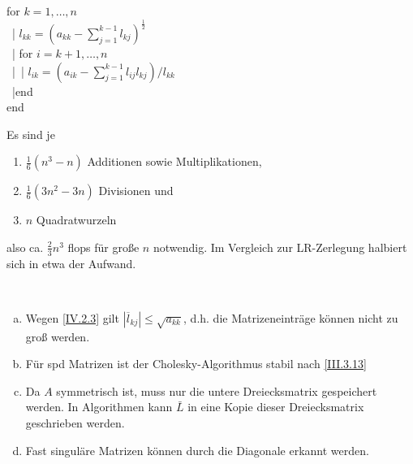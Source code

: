 \begin{pseudocode}{0.55\linewidth}
  for  $k=1, \dotsc , n$\\
  ~|\> $l_{kk} = (a_{kk}-\sum_{j=1}^{k-1}l_{kj})^{\frac{1}{2}}$ \\
  ~|\> for $i= k+1, \dotsc , n$ \\
  ~|\>~|\> $l_{ik} = ( a_{ik}- \sum_{j=1}^{k-1}l_{ij} l_{kj})/{l_{kk}}$  \\
  ~|\>end\\
  end
\end{pseudocode}



Es sind je 
\begin{enumerate}
\item[]$\frac{1}{6}(n^3-n) $ Additionen sowie Multiplikationen,
\item[]$\frac{1}{6}(3n^2-3n) $ Divisionen und
\item[]$n$ Quadratwurzeln
\end{enumerate}
also ca. $\frac{2}{3} n^3$ flops für große $n$ notwendig.
Im Vergleich zur LR-Zerlegung halbiert sich in etwa der Aufwand.

\begin{Beme}~
  \begin{enumerate}[a)]
  \item Wegen \eqref{IV.2.3} gilt $|\overline{l}_{kj}| \leq \sqrt{a_{kk}}$,
    d.h. die Matrizeneinträge können nicht zu groß werden.
  \item Für spd Matrizen ist der Cholesky-Algorithmus stabil nach \eqref{III.3.13}
  \item Da $A$ symmetrisch ist, muss nur die untere Dreiecksmatrix gespeichert werden.
    In Algorithmen kann $\bar{L}$ in eine Kopie dieser Dreiecksmatrix geschrieben werden.
  \item Fast singuläre Matrizen können durch die Diagonale erkannt werden.
  \end{enumerate}
\end{Beme}



